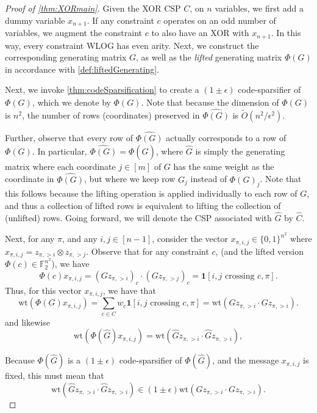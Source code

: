 \documentclass[11pt]{article}
\theoremstyle{definition}
\newcommand{\F}{\mathbb{F}}
\newcommand{\zo}{\{0, 1\}}
\newcommand{\eps}{\epsilon}
\newcommand{\wt}{\mathrm{wt}}
\begin{document}
\begin{proof}[Proof of \cref{thm:XORmain}]
Given the XOR CSP $C$, on $n$ variables, we first add a dummy variable $x_{n+1}$. If any constraint $c$ operates on an odd number of variables, we augment the constraint $c$ to also have an XOR with $x_{n+1}$. In this way, every constraint WLOG has even arity. Next, we construct the corresponding generating matrix $G$, as well as the \emph{lifted} generating matrix $\Phi(G)$ in accordance with \cref{def:liftedGenerating}. 
	
	Next, we invoke \cref{thm:codeSparsification} to create a $(1 \pm \eps)$ code-sparsifier of $\Phi(G)$, which we denote by $\widehat{\Phi(G)}$. Note that because the dimension of $\Phi(G)$ is $n^2$, the number of rows (coordinates) preserved in $\widehat{\Phi(G)}$ is $\widetilde{O}(n^2 / \eps^2)$.
	
	Further, observe that every row of $\widehat{\Phi(G)}$ actually corresponds to a row of $\Phi(G)$. In particular, $\widehat{\Phi(G)} = \Phi(\widehat{G})$, where $\hat{G}$ is simply the generating matrix where each coordinate $j \in [m]$ of $G$ has the same weight as the coordinate in $\widehat{\Phi(G)}$, but where we keep row $G_j$ instead of $\Phi(G)_j$. Note that this follows because the lifting operation is applied individually to each row of $G$, and thus a collection of lifted rows is equivalent to lifting the collection of (unlifted) rows. Going forward, we will denote the CSP associated with $\hat{G}$ by $\hat{C}$.
	
	Next, for any $\pi$, and any $i, j \in [n-1]$, consider the vector $x_{\pi, i, j} \in \zo^{n^2}$ where 
     $x_{\pi, i, j} = z_{\pi, > i} \otimes z_{\pi, > j}$. Observe that for any constraint $c$, (and the lifted version $\Phi(c) \in \F_2^{n^2}$), we have
	\[
	\Phi(c) x_{\pi, i, j} = (G z_{\pi, > i})_c \cdot  (G z_{\pi, > j})_c = \mathbf{1}[i,j \text{ crossing } c, \pi].
	\]
	Thus, for this vector $x_{\pi, i, j}$, we have that 
	\[
	\wt(\Phi(G) x_{\pi, i, j}) = \sum_{c \in C} w_c  \mathbf{1}[i,j \text{ crossing } c, \pi] =\wt(Gz_{\pi, > i} \cdot Gz_{\pi, > i}).
	\]
	and likewise
	\[
	\wt(\Phi(\widehat{G}) x_{\pi, i, j}) = \wt(\hat{G}z_{\pi, > i} \cdot \hat{G}z_{\pi, > i}),
	\]
	
	Because $\Phi(\hat{G})$ is a $(1 \pm \eps)$ code-sparsifier of $\Phi(\hat{G})$, and the message $x_{\pi, i, j}$ is fixed, this must mean that 
	\[
	\wt(\hat{G}z_{\pi, > i} \cdot \hat{G}z_{\pi, > i}) \in (1 \pm \eps) \wt(Gz_{\pi, > i} \cdot Gz_{\pi, > i}).
	\]
	

\end{proof}
\end{document}
